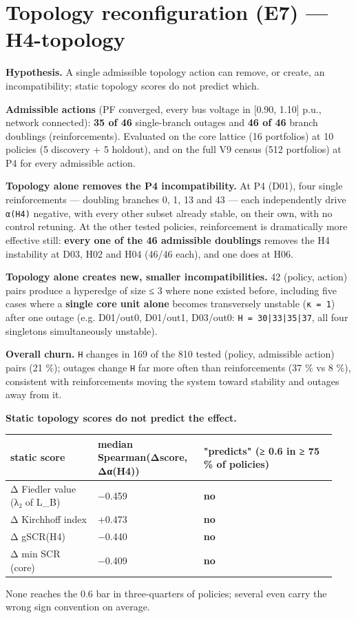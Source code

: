 \documentclass[10pt,a4paper]{article}
\begin{document}
\section{Topology reconfiguration (E7) — H4-topology}
\textbf{Hypothesis.} A single admissible topology action can remove, or create, an incompatibility; static topology scores do not predict which.

\textbf{Admissible actions} (PF converged, every bus voltage in [0.90, 1.10] p.u., network connected): \textbf{35 of 46} single-branch outages and \textbf{46 of 46} branch doublings (reinforcements). Evaluated on the core lattice (16 portfolios) at 10 policies (5 discovery + 5 holdout), and on the full V9 census (512 portfolios) at P4 for every admissible action.

\textbf{Topology alone removes the P4 incompatibility.} At P4 (D01), four single reinforcements — doubling branches 0, 1, 13 and 43 — each independently drive \texttt{α(H4)} negative, with every other subset already stable, on their own, with no control retuning. At the other tested policies, reinforcement is dramatically more effective still: \textbf{every one of the 46 admissible doublings} removes the H4 instability at D03, H02 and H04 (46/46 each), and one does at H06.

\textbf{Topology alone creates new, smaller incompatibilities.} 42 (policy, action) pairs produce a hyperedge of size ≤ 3 where none existed before, including five cases where a \textbf{single core unit alone} becomes transversely unstable (\texttt{κ =\allowbreak{} 1}) after one outage (e.g. D01/out0, D01/out1, D03/out0: \texttt{H =\allowbreak{} 30|33|35|37}, all four singletons simultaneously unstable).

\textbf{Overall churn.} \texttt{H} changes in 169 of the 810 tested (policy, admissible action) pairs (21 \%); outages change \texttt{H} far more often than reinforcements (37 \% vs 8 \%), consistent with reinforcements moving the system toward stability and outages away from it.

\textbf{Static topology scores do not predict the effect.}

{\small
\begin{longtable}{L{0.259\linewidth}L{0.297\linewidth}L{0.384\linewidth}}
\toprule
\textbf{static score} & \textbf{median Spearman(Δscore, Δα(H4))} & \textbf{"predicts" (≥ 0.6 in ≥ 75 \% of policies)} \\
\midrule
\endhead
Δ Fiedler value (λ₂ of L\_B) & −0.459 & \textbf{no} \\
Δ Kirchhoff index & +0.473 & \textbf{no} \\
Δ gSCR(H4) & −0.440 & \textbf{no} \\
Δ min SCR (core) & −0.409 & \textbf{no} \\
\bottomrule
\end{longtable}}
None reaches the 0.6 bar in three-quarters of policies; several even carry the wrong sign convention on average.
\end{document}
